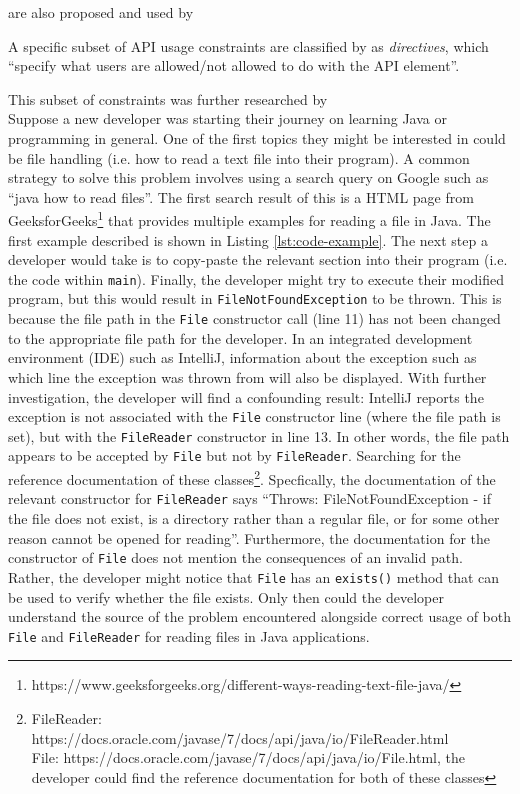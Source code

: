 are also proposed and used by 

A specific subset of API usage constraints are classified by \cite{maalej2013patterns} as \textit{directives}, which ``specify what users
are allowed/not allowed to do with the API element''. 

This subset of constraints was further researched by \citeauthor{caveat-knowledge-graph}
\\

Suppose a new developer was starting their journey on learning Java or programming in general. One of the first topics they might be interested in could be file handling (i.e. how to read a text file into their program). A common strategy to solve this problem involves using a search query on Google such as ``java how to read files''. The first search result of this is a HTML page from GeeksforGeeks\footnote{https://www.geeksforgeeks.org/different-ways-reading-text-file-java/} that provides multiple examples for reading a file in Java. The first example described is shown in Listing  \ref{lst:code-example}. The next step a developer would take is to copy-paste the relevant section into their program (i.e. the code within \lstinline{main}). Finally, the developer might try to execute their modified program, but this would result in \lstinline{FileNotFoundException} to be thrown. This is because the file path in the \lstinline{File} constructor call (line 11) has not been changed to the appropriate file path for the developer. In an integrated development environment (IDE) such as IntelliJ,  information about the exception such as which line the exception was thrown from will also be displayed. With further investigation, the developer will find a confounding result: IntelliJ reports the exception is not associated with the \lstinline{File} constructor line (where the file path is set), but with the \lstinline{FileReader} constructor in line 13. In other words, the file path appears to be accepted by \lstinline{File} but not by \lstinline{FileReader}. Searching for the reference documentation of these classes\footnote{FileReader: https://docs.oracle.com/javase/7/docs/api/java/io/FileReader.html \\\indent File: https://docs.oracle.com/javase/7/docs/api/java/io/File.html, the developer could find the reference documentation for both of these classes}. Specfically, the documentation of the relevant constructor for \lstinline{FileReader} says ``Throws: FileNotFoundException - if the file does not exist, is a directory rather than a regular file, or for some other reason cannot be opened for reading''. Furthermore, the documentation for the constructor of \lstinline{File} does not mention the consequences of an invalid path. Rather, the developer might notice that \lstinline{File} has an \lstinline{exists()} method that can be used to verify whether the file exists. Only then could the developer understand the source of the problem encountered alongside correct usage of both \lstinline{File} and \lstinline{FileReader} for reading files in Java applications.

